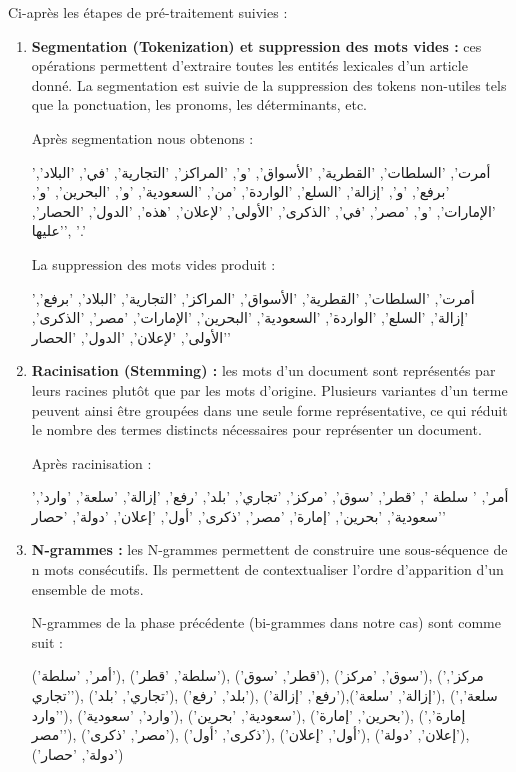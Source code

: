         Ci-après les étapes de pré-traitement suivies :
        \begin{enumerate}[leftmargin=*]
            \item{\textbf{Segmentation (Tokenization) et suppression des mots vides :} }ces opérations permettent d'extraire toutes les entités lexicales d'un article donné. La segmentation est suivie de la suppression des tokens non-utiles tels que la ponctuation, les pronoms, les déterminants, etc.

            Après segmentation nous obtenons : 
                \begin{arab}'أمرت', 'السلطات', 'القطرية', 'الأسواق', 'و', 'المراكز', 'التجارية', 'في', 'البلاد', 'برفع', 'و', 'إزالة', 'السلع', 'الواردة', 'من', 'السعودية', 'و', 'البحرين', 'و', 'الإمارات', 'و', 'مصر', 'في', 'الذكرى', 'الأولى', 'لإعلان', 'هذه', 'الدول', 'الحصار', 'عليها', '.'\end{arab}
            

            La suppression des mots vides produit : 
            \begin{arab}'أمرت', 'السلطات', 'القطرية', 'الأسواق', 'المراكز', 'التجارية', 'البلاد', 'برفع', 'إزالة', 'السلع', 'الواردة', 'السعودية', 'البحرين', 'الإمارات', 'مصر', 'الذكرى', 'الأولى', 'لإعلان', 'الدول', 'الحصار'\end{arab}
            
            
            \item{\textbf{Racinisation (Stemming) :} }les mots d'un document sont représentés par leurs racines plutôt que par les mots d'origine. Plusieurs variantes d'un terme peuvent ainsi être groupées dans une seule forme représentative, ce qui réduit le nombre des termes distincts nécessaires pour représenter un document.

            Après racinisation : 
            \begin{arab}'أمر', ' سلطة ', 'قطر', 'سوق', 'مركز', 'تجاري', 'بلد', 'رفع', 'إزالة', 'سلعة', 'وارد', 'سعودية', 'بحرين', 'إمارة', 'مصر', 'ذكرى', 'أول', 'إعلان', 'دولة', 'حصار'\end{arab}
            

            \item{\textbf{N-grammes :} }les N-grammes permettent de construire une sous-séquence de n mots consécutifs. Ils permettent de contextualiser l'ordre d'apparition d'un ensemble de mots.

            N-grammes de la phase précédente (bi-grammes dans notre cas) sont comme suit : 
            \begin{arab}('أمر', 'سلطة'), ('سلطة', 'قطر'), ('قطر', 'سوق'), ('سوق', 'مركز'), ('مركز', 'تجاري'), ('تجاري', 'بلد'), ('بلد', 'رفع'), ('رفع', 'إزالة'),('إزالة', 'سلعة'), ('سلعة', 'وارد'), ('وارد', 'سعودية'), ('سعودية', 'بحرين'), ('بحرين', 'إمارة'), ('إمارة', 'مصر'), ('مصر', 'ذكرى'), ('ذكرى', 'أول'), ('أول', 'إعلان'), ('إعلان', 'دولة'), ('دولة', 'حصار')\end{arab}
            
        \end{enumerate}
